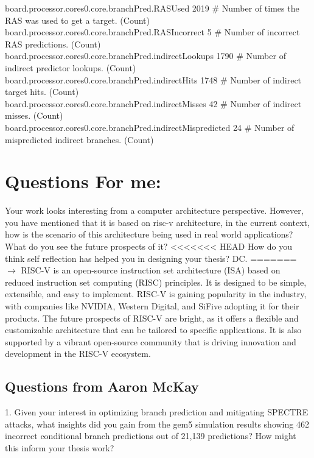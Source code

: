 board.processor.cores0.core.branchPred.RASUsed         2019 \# Number of times the RAS was used to get a target. (Count)\\
board.processor.cores0.core.branchPred.RASIncorrect     5 \# Number of incorrect RAS predictions. (Count)\\
board.processor.cores0.core.branchPred.indirectLookups  1790 \# Number of indirect predictor lookups. (Count)\\
board.processor.cores0.core.branchPred.indirectHits     1748 \# Number of indirect target hits. (Count)\\
board.processor.cores0.core.branchPred.indirectMisses    42 \# Number of indirect misses. (Count)\\
board.processor.cores0.core.branchPred.indirectMispredicted  24 \# Number of mispredicted indirect branches. (Count)\\

\section*{Questions For me: }
Your work looks interesting from a computer architecture perspective. However, you have mentioned that it is based on risc-v architecture, in the current context, how is the scenario of this architecture being used in real world applications? What do you see the future prospects of it?
<<<<<<< HEAD
How do you think self reflection has helped you in designing your thesis? DC.
=======
$\longrightarrow$ RISC-V is an open-source instruction set architecture (ISA) based on reduced instruction set computing (RISC) principles. 
It is designed to be simple, extensible, and easy to implement. RISC-V is gaining popularity in the industry, with companies like NVIDIA, Western Digital, and SiFive adopting it for their products. 
The future prospects of RISC-V are bright, as it offers a flexible and customizable architecture that can be tailored to specific applications. 
It is also supported by a vibrant open-source community that is driving innovation and development in the RISC-V ecosystem.

\subsection{Questions from Aaron McKay}
1. Given your interest in optimizing branch prediction and mitigating SPECTRE attacks, what insights did you gain from the gem5 simulation results showing 462 incorrect conditional branch predictions out of 21,139 predictions? How might this inform your thesis work?

